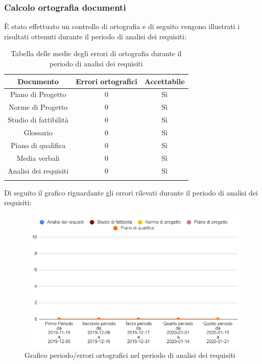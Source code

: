 \subsubsection{Calcolo ortografia documenti}
È stato effettuato un controllo di ortografia e di seguito vengono illustrati i risultati ottenuti durante il periodo di analisi dei requisiti:

\begin{center}
	\begin{longtable}{|c|c|c|}
	\hline
	\rowcolor{lighter-grayer}
	\textbf{Documento} & \textbf{Errori ortografici} & \textbf{Accettabile} \\
	\hline
	\endfirsthead

	\hline
	Piano di Progetto & 0 & Sì \\
	\hline
	\hline
	Norme di Progetto &  0 & Sì \\
	\hline
	\hline
	Studio di fattibilità & 0 & Sì \\
	\hline
	\hline
	Glossario & 0 & Sì \\
	\hline
	\hline
	Piano di qualifica & 0 & Sì \\
	\hline
	\hline
	Media verbali & 0 & Sì \\
	\hline
	\hline
	Analisi dei requisiti & 0 & Sì \\
	\hline
	\caption{Tabella delle medie degli errori di ortografia durante il periodo di analisi dei requisiti}
	\end{longtable}
\end{center}

Di seguito il grafico riguardante gli errori rilevati durante il periodo di analisi dei requisiti:

\begin{figure}[H]
	\centering
	\includegraphics[width=0.8\linewidth]{./res/images/ortografia.png}
	\caption{Grafico periodo/errori ortografici nel periodo di analisi dei requisiti}
	\label{fig:Grafico errori ortografici durante il periodo di analisi dei requisiti}
\end{figure}
